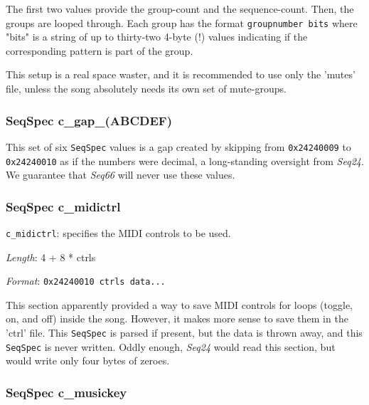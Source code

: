    The first two values provide the group-count and the sequence-count.
   Then, the groups are looped through. Each group has the format
   \texttt{groupnumber bits} where "bits" is a string of up to thirty-two
   4-byte (!) values indicating if the corresponding pattern is part of
   the group.

   This setup is a real space waster, and it is recommended to use only
   the 'mutes' file, unless the song absolutely needs its own set of
   mute-groups.

\subsubsection{SeqSpec c\_gap\_(ABCDEF)}
\label{subsubsec:midi_format_track_seqspec_gap_abcdef}

   This set of six
   \texttt{SeqSpec} values is a gap created by skipping from
   \texttt{0x24240009} to \texttt{0x24240010} as if the numbers were
   decimal, a long-standing oversight from \textsl{Seq24}.
   We guarantee that \textsl{Seq66} will never use these values.

\subsubsection{SeqSpec c\_midictrl}
\label{subsubsec:midi_format_track_seqspec_midictrl}

   \begin{description}
      \item \texttt{c\_midictrl}: specifies the MIDI controls to be used.
      \item \textsl{Length}: 4 + 8 * ctrls
      \item \textsl{Format}: \texttt{0x24240010 ctrls data...}
   \end{description}
   
   This section apparently provided a way to save MIDI controls for loops
   (toggle, on, and off) inside the song.  However, it makes more sense to
   save them in the 'ctrl' file.  This
   \texttt{SeqSpec} is parsed if present, but
   the data is thrown away, and this
   \texttt{SeqSpec} is never written.
   Oddly enough, \textsl{Seq24} would read this section, but would write only
   four bytes of zeroes.

\subsubsection{SeqSpec c\_musickey}
\label{subsubsec:midi_format_track_seqspec_musickey}

